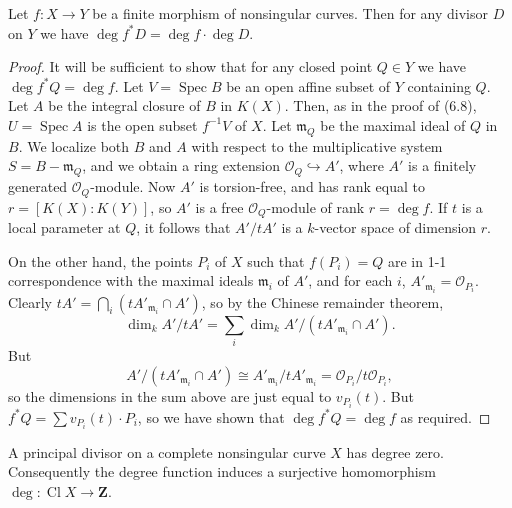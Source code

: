 

\DeclareMathOperator{\Spec}{Spec}
\DeclareMathOperator{\Cl}{Cl}

\begin{proposition}[6.9]
Let $f\colon X \to Y$ be a finite morphism of nonsingular curves. Then for
any divisor $D$ on $Y$ we have $\deg f^*D = \deg f \cdot \deg D$.
\end{proposition}

\begin{proof}
It will be sufficient to show that for any closed point $Q \in Y$ we have
$\deg f^*Q = \deg f$. Let $V = \Spec B$ be an open affine subset of $Y$
containing $Q$. Let $A$ be the integral closure of $B$ in $K(X)$. Then, as
in the proof of (6.8), $U = \Spec A$ is the open subset $f^{-1}V$ of $X$.
Let $\mathfrak{m}_Q$ be the maximal ideal of $Q$ in $B$. We localize both
$B$ and $A$ with respect to the multiplicative system
$S = B - \mathfrak{m}_Q$, and we obtain a ring extension
$\mathcal{O}_Q \hookrightarrow A'$, where $A'$ is a finitely generated
$\mathcal{O}_Q$-module. Now $A'$ is torsion-free, and has rank equal to
$r = [K(X)\colon K(Y)]$, so $A'$ is a free $\mathcal{O}_Q$-module of rank
$r = \deg f$. If $t$ is a local parameter at $Q$, it follows that $A'/tA'$
is a $k$-vector space of dimension $r$.

On the other hand, the points $P_i$ of $X$ such that $f(P_i) = Q$ are in
1-1 correspondence with the maximal ideals $\mathfrak{m}_i$ of $A'$, and for
each $i$, $A'_{\mathfrak{m}_i} = \mathcal{O}_{P_i}$. Clearly
$tA' = \bigcap_i (tA'_{\mathfrak{m}_i} \cap A')$, so by the Chinese
remainder theorem,
\[
  \dim_k A'/tA' = \sum_i \dim_k A'/(tA'_{\mathfrak{m}_i} \cap A').
\]
But
\[
  A'/(tA'_{\mathfrak{m}_i} \cap A') \cong
  A'_{\mathfrak{m}_i}/tA'_{\mathfrak{m}_i} =
  \mathcal{O}_{P_i}/t\mathcal{O}_{P_i},
\]
so the dimensions in the sum above are just equal to $v_{P_i}(t)$. But
$f^*Q = \sum v_{P_i}(t) \cdot P_i$, so we have shown that
$\deg f^*Q = \deg f$ as required.
\end{proof}

\begin{corollary}[6.10]
A principal divisor on a complete nonsingular curve $X$ has degree zero.
Consequently the degree function induces a surjective homomorphism
$\deg\colon \Cl X \to \mathbf{Z}$.
\end{corollary}

